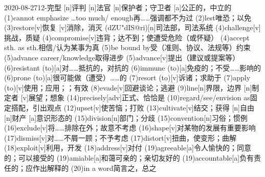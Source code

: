\documentclass[12pt]{ctexart}
\begin{document}
\begin{wordlist}{2020-08-27}{12-完型}
  [n]{评判}
  [n]{法官}
  [n]{保护者；守卫者}
  [a]{公正的，中立的}
  \word(1){cannot emphasize \dots too much/ enough}{再……强调都不为过}
  \word(2){lest}{唯恐；以免}
  \word[2020-08-29](3){restore}[v]{恢复}
  [v]{消除，消灭}
  (dZU"dIS@ri)[n]{司法部，司法系统}
  \word(4){challenge}[v]{挑战，质疑}
  \word(4){compromise}[v]{违背；达不到；使遭受危险（或怀疑）}
  \word(4){accept sth. as sth.}{相信/认为某事为真}
  \word(5){be bound by}{受（准则、协议、法规等）约束}
  \word(5){advance career/knowledge}{取得进步}
  \word(5){advance}[v]{提出（建议或提案等）}
  \word(6){resistant (to)}[a]{对……抵抗的，对抗的}
  \word(6){immune (to)}[a]{免疫的；不受……影响的}
  \word[2020-08-29](6){prone (to)}[a]{很可能做（遭受）……的}
  \word(7){resort (to)}[v]{诉诸；求助于}
  \word(7){apply (to)}[v]{使用；应用；；有效}
  \word(8){evade}[v]{回避谈论；逃避}
  \word(9){line}[n]{界限，边界}
  [n]{制定者}
  [v]{展望；想象}
  \word(14){precisely}[adv]{正式、恰恰是}
  \word(10){regard/see/envision as}{固定搭配，引出观点}
  \word(12){upset}[v]{使苦恼；打败}
  \word(13){cultivate}[v]{结交；获得}
  [n]{自由}
  [n]{财产}
  [a]{意识形态的}
  \word(15){division}[n]{部门；分歧}
  \word(15){convention}[n]{习俗；惯例}
  \word(16){exclude}[v]{将……排除在外；故意不考虑}
  \word(16){shape}[v]{对某物的发展有重要影响}
  \word(17){dismiss}[v]{对……不屑一顾；不予考虑}
  \word[2020-08-29](17){distort}[v]{扭曲，使变形；曲解}
  \word[2020-08-29](18){exploit}[v]{利用，开发}
  \word(18){address}[v]{对付}
  \word(19){agreeable}[a]{令人愉快的；同意的；可以接受的}
  \word[2020-08-31](19){amiable}[a]{和蔼可亲的；亲切友好的}
  \word[2020-08-29](19){accountable}[a]{负有责任的；应作出解释的}
  \word(20){in a word}{简言之，总之}
\end{wordlist}
\end{document}
